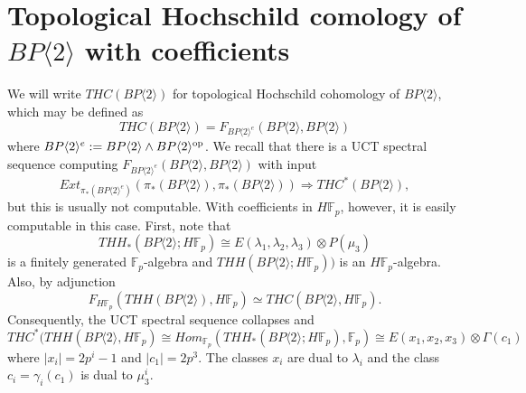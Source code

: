 
\section{Topological Hochschild comology of $BP\langle 2\rangle$ with coefficients}

We will write $THC(BP\langle 2\rangle)$ for topological Hochschild cohomology of $BP\langle 2\rangle$, which may be defined as 
\[ THC(BP\langle 2\rangle) = F_{BP\langle 2\rangle^e} (BP\langle 2\rangle,BP\langle 2\rangle) \]
where $BP\langle 2\rangle^e:=BP\langle 2\rangle\wedge BP\langle 2\rangle^{\mathrm{op}}$. 
We recall that there is a UCT spectral sequence computing $F_{BP\langle 2\rangle^e} (BP\langle 2\rangle,BP\langle 2\rangle)$ with input 
\[ Ext_{ \pi_*(BP\langle 2\rangle^e)} (\pi_*(BP\langle 2\rangle),\pi_*(BP\langle 2\rangle)) \Rightarrow THC^*(BP\langle 2\rangle), \]
but this is usually not computable. With coefficients in $H\mathbb{F}_p$, however, it is easily computable in this case. First, note that 
\[ THH_*(BP\langle 2\rangle; H\mathbb{F}_p)\cong E(\lambda_1,\lambda_2,\lambda_3)\otimes P(\mu_3)\]
 is a finitely generated $\mathbb{F}_p$-algebra and $THH(BP\langle 2\rangle; H\mathbb{F}_p))$ is an $H\mathbb{F}_p$-algebra. Also, by adjunction
\[ F_{H\mathbb{F}_p} (THH(BP\langle 2 \rangle ) , H\mathbb{F}_p ) \simeq THC(BP\langle 2 \rangle , H\mathbb{F}_p). \] 
Consequently, the UCT spectral sequence collapses and 
\[ THC^*(THH(BP\langle 2 \rangle , H\mathbb{F}_p)\cong Hom_{\mathbb{F}_p}(THH_*(BP\langle 2 \rangle;H\mathbb{F}_p),\mathbb{F}_p) \cong E(x_1,x_2,x_3)\otimes \Gamma(c_1) \]
where $|x_i|=2p^i-1$ and $|c_1|=2p^3$. The classes $x_i$ are dual to $\lambda_i$ and the class $c_i=\gamma_i(c_1)$ is dual to $\mu_3^i$.  

